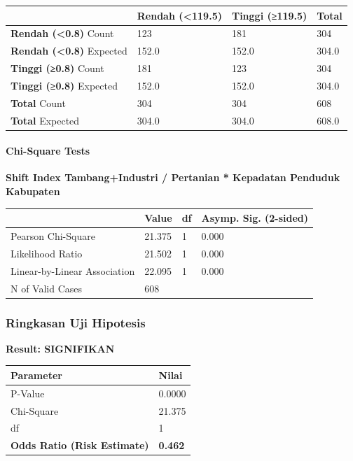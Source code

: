 \documentclass[
]{article}
\newcounter{none} %
\begin{document}
{\def\LTcaptype{none} %
\begin{longtable}[]{@{}llll@{}}
\toprule\noalign{}
& Rendah (\textless119.5) & Tinggi (≥119.5) & Total \\
\midrule\noalign{}
\endhead
\bottomrule\noalign{}
\endlastfoot
\textbf{Rendah (\textless0.8)} Count & 123 & 181 & 304 \\
\textbf{Rendah (\textless0.8)} Expected & 152.0 & 152.0 & 304.0 \\
\textbf{Tinggi (≥0.8)} Count & 181 & 123 & 304 \\
\textbf{Tinggi (≥0.8)} Expected & 152.0 & 152.0 & 304.0 \\
\textbf{Total} Count & 304 & 304 & 608 \\
\textbf{Total} Expected & 304.0 & 304.0 & 608.0 \\
\end{longtable}
}

\paragraph{Chi-Square Tests}\label{chi-square-tests}

\textbf{Shift Index Tambang+Industri / Pertanian * Kepadatan Penduduk
Kabupaten}

{\def\LTcaptype{none} %
\begin{longtable}[]{@{}llll@{}}
\toprule\noalign{}
& Value & df & Asymp. Sig. (2-sided) \\
\midrule\noalign{}
\endhead
\bottomrule\noalign{}
\endlastfoot
Pearson Chi-Square & 21.375 & 1 & 0.000 \\
Likelihood Ratio & 21.502 & 1 & 0.000 \\
Linear-by-Linear Association & 22.095 & 1 & 0.000 \\
N of Valid Cases & 608 & & \\
\end{longtable}
}

\subsubsection{Ringkasan Uji Hipotesis}\label{ringkasan-uji-hipotesis}

\textbf{Result: SIGNIFIKAN}

{\def\LTcaptype{none} %
\begin{longtable}[]{@{}ll@{}}
\toprule\noalign{}
Parameter & Nilai \\
\midrule\noalign{}
\endhead
\bottomrule\noalign{}
\endlastfoot
P-Value & 0.0000 \\
Chi-Square & 21.375 \\
df & 1 \\
\textbf{Odds Ratio (Risk Estimate)} & \textbf{0.462} \\
\end{longtable}
}
\end{document}
